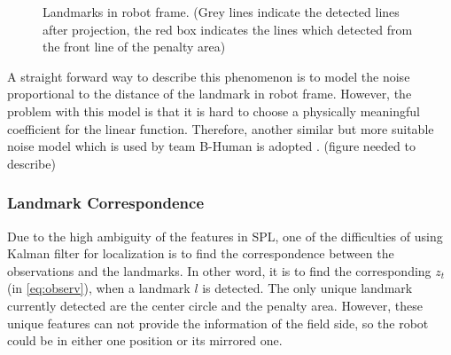 \begin{figure}[h!]
  \centering
{}
  \caption{Landmarks in robot frame. (Grey lines indicate the detected lines after projection, the red box indicates the lines which detected from the front line of the penalty area)}
  \label{fig:landmarkRobotFrame}
\end{figure}

A straight forward way to describe this phenomenon is to model the noise proportional to the distance of the landmark in robot frame. However, the problem with this model is that it is hard to choose a physically meaningful coefficient for the linear function. Therefore, another similar but more suitable noise model which is used by team B-Human is adopted \cite{Bhuman}. (figure needed to describe)


\subsubsection{Landmark Correspondence}
Due to the high ambiguity of the features in \gls{SPL}, one of the difficulties of using Kalman filter for localization is to find the correspondence between the observations and the landmarks. In other word, it is to find the corresponding $z_t$ (in \autoref{eq:observ}), when a landmark $l$ is detected. The only unique landmark currently detected are the center circle and the penalty area. However, these unique features can not provide the information of the field side, so the robot could be in either one position or its mirrored one. 


